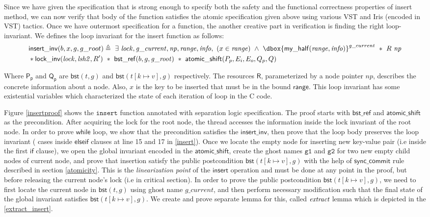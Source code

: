 \documentclass[acmsmall,screen]{acmart}\settopmatter{printfolios=true}
\newcommand\dboxed[1]{\dbox{\ensuremath{#1}}}
\newcommand{\ghost}[2]{\ensuremath{\dboxed{#1}^{#2}}}
\newcommand{\treerep}{\ensuremath{\mathsf{bst}}}
\newcommand{\nodeboxrep}{\ensuremath{\mathsf{bst\_ref}}}
\begin{document}
Since we have given the specification that is strong enough to specify both the safety and the functional correctness properties of insert method, we can now verify that body of the function satisfies the atomic specification given above using various VST and Iris (encoded in VST) tactics. Once we have outermost specification for a function, the another creative part in verification is finding the right loop-invariant. We defines the loop invariant for the insert function as follows: 
\begin{align*} &\mathsf{insert\_inv}(b, x, g, g\_root) \triangleq\ \exists\ \mathit{lock},\mathit{g\_current},\mathit{np},\mathit{range},\mathit{info},\ (x\in \mathit{range})\ \land \ \ghost{\mathsf{my\_half}(\mathit{range},\mathit{info})}{g\_current}\ *\ R\ \mathit{np}\\& * \mathsf{lock\_inv}(\mathit{lock},\mathit{lsh2},R')\ *\ \nodeboxrep(b,g,\mathit{g\_root})\ *\ \mathsf{atomic\_shift} (P_p,E_i,E_o,Q_p,Q) \end{align*}   

Where $\mathsf{P_p}$ and $\mathsf{Q_p}$ are $\treerep(t,g)$ and $\treerep(t[k\mapsto v],g)$ respectively. The resources $\mathsf{R}$, parameterized by a node pointer $np$, describes the concrete information about a node. Also, $x$ is the key to be inserted that must be in the bound $\mathsf{range}$.  This loop invariant has some existential variables which characterized the state of each iteration of loop in the C code.

Figure \ref{insertproof} shows the $\texttt{insert}$ function annotated with separation logic specification. The proof starts with $\nodeboxrep$ and $\mathsf{atomic\_shift}$ as the precondition. After acquiring the lock for the root node, the thread accesses the information inside the lock invariant of the root node. In order to prove $\mathsf{while}$ loop, we show that the precondition satisfies the $\mathsf{insert\_inv}$, then prove that the loop body preserves the loop invariant ( cases inside $\mathsf{else if}$ clauses at line 15 and 17 in \ref{insert}).   Once we locate the empty node for inserting new key-value pair (i.e inside the first $\mathsf{if}$ clause), we open the global invariant encoded in the $\mathsf{atomic\_shift}$, create the ghost names $\texttt{g1}$ and $\texttt{g2}$ for two new empty child nodes of current node, and prove that insertion satisfy the public postcondition $\treerep(t[k\mapsto v],g)$ with the help of $\mathsf{sync\_commit}$ rule described in section \ref{atomicity}. This is the \emph{linearization point} of the $\mathsf{insert}$ operation and must be done at any point in the proof, but before releasing the current node's lock (i.e in critical section). In order to prove the public postcondition $\treerep(t[k\mapsto v],g)$, we need to first locate the current node in $\treerep(t,g)$ using ghost name $g\_current$, and then perform necessary modification such that the final state of the global invariant satisfies $\treerep(t[k\mapsto v],g)$. We create and prove separate lemma for this, called $\emph{extract}$ lemma which is depicted in the \ref{extract_insert}.  
\end{document}

